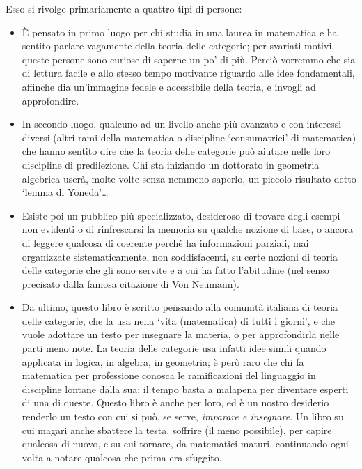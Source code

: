 Esso si rivolge primariamente a quattro tipi di persone:
\begin{itemize}
	\item \`E pensato in primo luogo per chi studia in una laurea in matematica e ha sentito parlare vagamente della teoria delle categorie; per svariati motivi, queste persone sono curiose di saperne un po' di più. Perciò vorremmo che sia di lettura facile e allo stesso tempo motivante riguardo alle idee fondamentali, affinche dia un'immagine fedele e accessibile della teoria, e invogli ad approfondire.
	\item In secondo luogo, qualcuno ad un livello anche più avanzato e con interessi diversi (altri rami della matematica o discipline `consumatrici' di matematica) che hanno sentito dire che la teoria delle categorie pu\`o aiutare nelle loro discipline di predilezione. Chi sta iniziando un dottorato in geometria algebrica userà, molte volte senza nemmeno saperlo, un piccolo risultato detto `lemma di Yoneda'\dots
	\item Esiste poi un pubblico pi\`u specializzato, desideroso di trovare degli esempi non evidenti o di rinfrescarsi la memoria su qualche nozione di base, o ancora di leggere qualcosa di coerente perché ha informazioni parziali, mai organizzate sistematicamente, non soddisfacenti, su certe nozioni di teoria delle categorie che gli sono servite e a cui ha fatto l'abitudine (nel senso precisato dalla famosa citazione di Von Neumann).
	\item Da ultimo, questo libro è scritto pensando alla comunità italiana di teoria delle categorie, che la usa nella `vita (matematica) di tutti i giorni', e che vuole adottare un testo per insegnare la materia, o per approfondirla nelle parti meno note. La teoria delle categorie usa infatti idee simili quando applicata in logica, in algebra, in geometria; è però raro che chi fa matematica per professione conosca le ramificazioni del linguaggio in discipline lontane dalla sua: il tempo basta a malapena per diventare esperti di una di queste. Questo libro è anche per loro, ed è un nostro desiderio renderlo un testo con cui si può, se serve, \emph{imparare e insegnare}. Un libro su cui magari anche sbattere la testa, soffrire (il meno possibile), per capire qualcosa di nuovo, e su cui tornare, da matematici maturi, continuando ogni volta a notare qualcosa che prima era sfuggito.
\end{itemize}
\Todo{}

